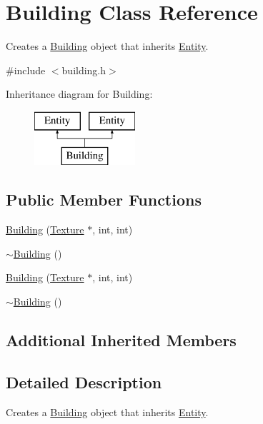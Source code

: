 \hypertarget{class_building}{\section{Building Class Reference}
\label{class_building}
}


Creates a \hyperlink{class_building}{Building} object that inherits \hyperlink{class_entity}{Entity}.  




{\ttfamily \#include $<$building.\+h$>$}

Inheritance diagram for Building\+:\begin{figure}[H]
\begin{center}
\leavevmode
\includegraphics[height=2.000000cm]{class_building}
\end{center}
\end{figure}
\subsection*{Public Member Functions}
\begin{DoxyCompactItemize}
\item 
\hyperlink{class_building_a87b35657776dd85a29f7aed5f631cf79}{Building} (\hyperlink{class_texture}{Texture} $\ast$, int, int)
\item 
\hyperlink{class_building_ab675c6a382e110b84031956cda708439}{$\sim$\+Building} ()
\item 
\hyperlink{class_building_a87b35657776dd85a29f7aed5f631cf79}{Building} (\hyperlink{class_texture}{Texture} $\ast$, int, int)
\item 
\hyperlink{class_building_ab675c6a382e110b84031956cda708439}{$\sim$\+Building} ()
\end{DoxyCompactItemize}
\subsection*{Additional Inherited Members}


\subsection{Detailed Description}
Creates a \hyperlink{class_building}{Building} object that inherits \hyperlink{class_entity}{Entity}. 

